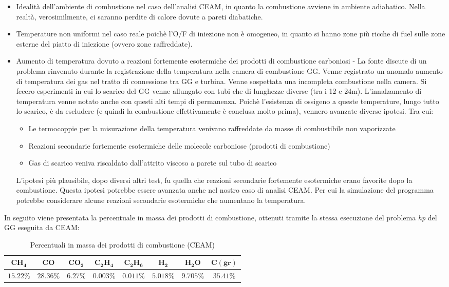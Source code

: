 \begin{itemize}
\item Idealità dell'ambiente di combustione nel caso dell'analisi CEAM, in quanto la combustione avviene in ambiente adiabatico. Nella realtà, verosimilmente, ci saranno perdite di calore dovute a pareti diabatiche. 
\item Temperature non uniformi nel caso reale poichè l'O/F di iniezione non è omogeneo, in quanto si hanno zone più ricche di fuel sulle zone esterne del piatto di iniezione (ovvero zone raffreddate). 
\item Aumento di temperatura dovuto a reazioni fortemente esotermiche dei prodotti di combustione carboniosi - La fonte \cite{gg_manual} discute di un problema rinvenuto durante la registrazione della temperatura nella camera di combustione GG. Venne registrato un anomalo aumento di temperatura dei gas nel tratto di connessione tra GG e turbina. Venne sospettata una incompleta combustione nella camera. Si fecero esperimenti in cui lo scarico del GG venne allungato con tubi che di lunghezze diverse (tra i 12 e 24m). L'innalzamento di temperatura venne notato anche con questi alti tempi di permanenza. Poichè l'esistenza di ossigeno a queste temperature, lungo tutto lo scarico, è da escludere (e quindi la combustione effettivamente è conclusa molto prima), vennero avanzate diverse ipotesi. Tra cui: 
\begin{itemize}
\item Le termocoppie per la misurazione della temperatura venivano raffreddate da masse di combustibile non vaporizzate
\item Reazioni secondarie fortemente esotermiche delle molecole carboniose (prodotti di combustione)
\item Gas di scarico veniva riscaldato dall'attrito viscoso a parete sul tubo di scarico
\end{itemize}
L'ipotesi più plausibile, dopo diversi altri test, fu quella che reazioni secondarie fortemente esotermiche erano favorite dopo la combustione. Questa ipotesi potrebbe essere avanzata anche nel nostro caso di analisi CEAM. Per cui la simulazione del programma potrebbe considerare alcune reazioni secondarie esotermiche che aumentano la temperatura. 
\end{itemize}

In seguito viene presentata la percentuale in massa dei prodotti di combustione, ottenuti tramite la stessa esecuzione del problema \textit{hp} del GG eseguita da CEAM:

\begin{table}[H]

\centering
\begin{tabular}{|c|c|c|c|c|c|c|c|}
\hline
$\bm{CH_4}$ & $\bm{CO}$ & $\bm{CO_2}$ & $\bm{C_2H_4}$ & $\bm{C_2H_6}$ & $\bm{H_2}$ & $\bm{H_2O}$ & $\bm{C(gr)}$ \\
\hline
$15.22 \%$ & $28.36 \%$ & $6.27 \%$ & $0.003 \%$ & $0.011 \%$ & $5.018 \%$ & $9.705 \%$ & $35.41 \%$ \\
\hline
\end{tabular}

\caption{Percentuali in massa dei prodotti di combustione (CEAM)}
\label{table:output_CEAM_percentage}

\end{table}